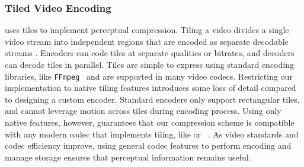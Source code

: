 \subsubsection{Tiled Video Encoding} \name uses tiles to implement perceptual compression.
Tiling a video divides a single video stream into independent regions that are encoded as separate decodable streams \cite{6547985}.
Encoders can code tiles at separate qualities or bitrates, and decoders can decode tiles in parallel.
Tiles are simple to express using standard encoding libraries, like \texttt{FFmpeg}~\cite{ffmpeg} and are supported in many video codecs.
Restricting our implementation to native tiling features introduces some loss of detail compared to designing a custom encoder.
Standard encoders only support rectangular tiles, and cannot leverage motion across tiles during encoding process.
Using only native features, however, guarantees that our compression scheme is compatible with any modern codec that implements tiling, like \hevc or \avone~\cite{avone}.
As video standards and codec efficiency improve, using general codec features to perform encoding and manage storage ensures that perceptual information remains useful.
